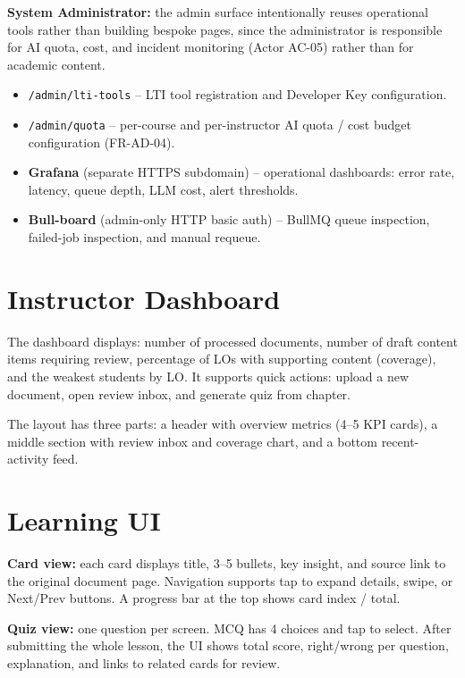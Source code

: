 \textbf{System Administrator:} the admin surface intentionally reuses
operational tools rather than building bespoke pages, since the
administrator is responsible for AI quota, cost, and incident
monitoring (Actor AC-05) rather than for academic content.

\begin{itemize}
    \item \texttt{/admin/lti-tools} -- LTI tool registration and
          Developer Key configuration.
    \item \texttt{/admin/quota} -- per-course and per-instructor AI
          quota / cost budget configuration (FR-AD-04).
    \item \textbf{Grafana} (separate HTTPS subdomain) -- operational
          dashboards: error rate, latency, queue depth, LLM cost,
          alert thresholds.
    \item \textbf{Bull-board} (admin-only HTTP basic auth) -- BullMQ
          queue inspection, failed-job inspection, and manual requeue.
\end{itemize}

\section{Instructor Dashboard}
\label{appendix:ui-instructor-dashboard}

The dashboard displays: number of processed documents, number of draft
content items requiring review, percentage of LOs with supporting content
(coverage), and the weakest students by LO. It supports quick actions:
upload a new document, open review inbox, and generate quiz from chapter.

The layout has three parts: a header with overview metrics (4--5 KPI
cards), a middle section with review inbox and coverage chart, and a
bottom recent-activity feed.

\section{Learning UI}
\label{appendix:ui-learning}

\textbf{Card view:} each card displays title, 3--5 bullets, key insight,
and source link to the original document page. Navigation supports tap to
expand details, swipe, or Next/Prev buttons. A progress bar at the top
shows card index / total.

\textbf{Quiz view:} one question per screen. MCQ has 4 choices and tap to
select. After submitting the whole lesson, the UI shows total score,
right/wrong per question, explanation, and links to related cards for
review.

